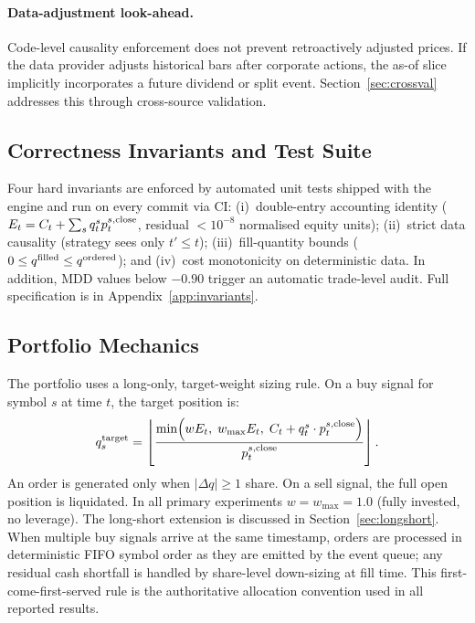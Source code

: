 \documentclass[12pt]{article}
\begin{document}
\paragraph{Data-adjustment look-ahead.}
Code-level causality enforcement does not prevent retroactively adjusted
prices. If the data provider adjusts historical bars after corporate
actions, the as-of slice implicitly incorporates a future dividend or
split event. Section~\ref{sec:crossval} addresses this through
cross-source validation.

\subsection{Correctness Invariants and Test Suite}
\label{sec:invariants}

Four hard invariants are enforced by automated unit tests shipped with
the engine and run on every commit via CI: (i)~double-entry accounting
identity ($E_t = C_t + \sum_s q^s_t p^{s,\rm close}_t$, residual
$<10^{-8}$ normalised equity units); (ii)~strict data causality
(strategy sees only $t' \le t$); (iii)~fill-quantity bounds
($0 \le q^{\rm filled} \le q^{\rm ordered}$); and (iv)~cost
monotonicity on deterministic data. In addition, MDD values below
$-0.90$ trigger an automatic trade-level audit.
Full specification is in Appendix~\ref{app:invariants}.

\subsection{Portfolio Mechanics}

The portfolio uses a long-only, target-weight sizing rule. On a buy
signal for symbol $s$ at time $t$, the target position is:
\begin{equation}
  q^{\rm target}_s =
    \left\lfloor
      \frac{\min\!\left(w E_t,\; w_{\max} E_t,\;
             C_t + q^s_t \cdot p^{s,\rm close}_t\right)}
            {p^{s,\rm close}_t}
    \right\rfloor.
  \label{eq:target_qty}
\end{equation}
An order is generated only when $|\Delta q| \ge 1$ share. On a sell
signal, the full open position is liquidated. In all primary experiments
$w = w_{\max} = 1.0$ (fully invested, no leverage). The long-short
extension is discussed in Section~\ref{sec:longshort}.
When multiple buy signals arrive at the same timestamp, orders are
processed in deterministic FIFO symbol order as they are emitted by the
event queue; any residual cash shortfall is handled by share-level
down-sizing at fill time. This first-come-first-served rule is the
authoritative allocation convention used in all reported results.
\end{document}
